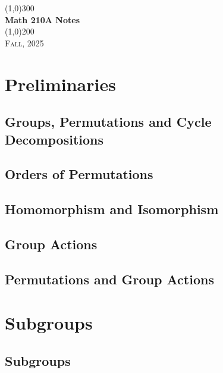 \documentclass[a4paper, openany]{book}
\begin{document}
\begin{titlepage}
    \begin{center}
        \line(1,0){300} \\
        [0.25in]
        \huge{\bfseries Math 210A Notes} \\
        [2mm]
        \line(1,0){200} \\
        [1.5cm]
        \textsc{\LARGE Fall, 2025}
    \end{center}
\end{titlepage}

\tableofcontents
\setcounter{section}{0}

\chapter{Preliminaries}
\section{Groups, Permutations and Cycle Decompositions}

\newpage

\section{Orders of Permutations}

\newpage

\section{Homomorphism and Isomorphism}

\newpage

\section{Group Actions}

\newpage

\section{Permutations and Group Actions}

\newpage

\chapter{Subgroups}
\section{Subgroups}

\newpage
\end{document}
